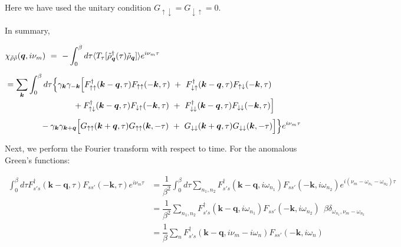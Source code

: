 \documentclass[a4j]{jsarticle}
\begin{document}
Here we have used the unitary condition $G_{\uparrow \downarrow} = G_{\downarrow \uparrow} = 0$.

In summary,

\begin{align}
	&
	\chi_{\tilde{\rho} \tilde{\rho}}(\bm{q},i \nu_{m})
	\ = \
	-
	\int^{\beta}_{0} d \tau
	\langle T_{\tau}[ \tilde{\rho}_{\bm{q}}^{\dagger} (\tau) \tilde{\rho}_{\bm{q}} ] \rangle
	e^{i \nu_{m} \tau}
	\nonumber \\[2mm]
	&=
	\sum_{ \bm{k} }
	\int^{\beta}_{0} d \tau
	\Big\{
	\gamma_{\bm{k}}
	\gamma_{-\bm{k}}
	\Big[
		F_{ \uparrow \uparrow }^{\dagger}( \bm{k} - \bm{q} , \tau )
		F_{ \uparrow \uparrow } ( - \bm{k} , \tau )
		\ + \
		F_{ \downarrow \uparrow }^{\dagger}( \bm{k} - \bm{q} , \tau )
		F_{ \uparrow \downarrow } ( - \bm{k} , \tau )
	\nonumber \\[-1mm] & \hspace{29mm} +
	F_{ \uparrow \downarrow }^{\dagger}( \bm{k} - \bm{q} , \tau )
	F_{ \downarrow \uparrow } ( - \bm{k} , \tau )
	\ + \
	F_{ \downarrow \downarrow }^{\dagger}( \bm{k} - \bm{q} , \tau )
	F_{ \downarrow \downarrow } ( - \bm{k} , \tau )
	\Big]
	\nonumber \\[1mm] & \hspace{15mm} -
	\gamma_{\bm{k}}
	\gamma_{\bm{k}+\bm{q}}
	\Big[
		G_{\uparrow \uparrow}( \bm{k}+\bm{q} , \tau)
		G_{\uparrow \uparrow}( \bm{k} , - \tau)
		\ + \
		G_{\downarrow \downarrow}( \bm{k}+\bm{q} , \tau)
		G_{\downarrow \downarrow}( \bm{k} , - \tau)
		\Big]
	\Big\}
	e^{i \nu_{m} \tau}
\end{align}

Next, we perform the Fourier transform with respect to time.
For the anomalous Green's functions:

\begin{align}
	\int^{\beta}_{0} d \tau
	F_{ s' s }^{\dagger}( \bm{k} - \bm{q} , \tau )
	F_{ s s' } ( - \bm{k} , \tau )
	e^{i \nu_{m} \tau}
	&=
	\dfrac{1}{\beta^{2}}
	\int^{\beta}_{0} d \tau
	\sum_{n_{1},n_{2}}
	F_{ s' s }^{\dagger}( \bm{k} - \bm{q} , i \omega_{n_{1}} )
	F_{ s s' } ( - \bm{k} , i \omega_{n_{2}} )
	e^{i ( \nu_{m} - \omega_{n_{1}} - \omega_{n_{2}} ) \tau }
	\nonumber \\[2mm] &=
	\dfrac{ 1 }{\beta^{2}} \sum_{n_{1},n_{2}}
	F_{ s' s }^{\dagger}( \bm{k} - \bm{q} , i \omega_{n_{1}} )
	F_{ s s' } ( - \bm{k} , i \omega_{n_{2}} )
	\ \ \beta
	\delta_{ \omega_{n_{1}} , \nu_{m} - \omega_{n_{2}} }
	\nonumber \\[2mm] &=
	\dfrac{ 1 }{\beta} \sum_{n}
	F_{ s' s }^{\dagger}( \bm{k} - \bm{q} , i \nu_{m} - i \omega_{n} )
	F_{ s s' } ( - \bm{k} , i \omega_{n} )
\end{align}
\end{document}
